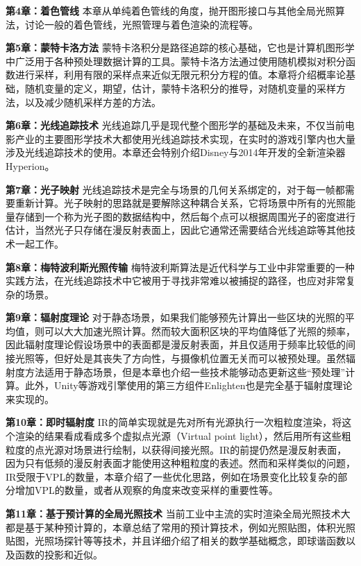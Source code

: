 \textbf{第4章：着色管线 } 本章从单纯着色管线的角度，抛开图形接口与其他全局光照算法，讨论一般的着色管线，光照管理与着色渲染的流程等。

\textbf{第5章：蒙特卡洛方法 } 蒙特卡洛积分是路径追踪的核心基础，它也是计算机图形学中广泛用于各种预处理数据计算的工具。蒙特卡洛方法通过使用随机模拟对积分函数进行采样，利用有限的采样点来近似无限元积分方程的值。本章将介绍概率论基础，随机变量的定义，期望，估计，蒙特卡洛积分的推导，对随机变量的采样方法，以及减少随机采样方差的方法。

\textbf{第6章：光线追踪技术 } 光线追踪几乎是现代整个图形学的基础及未来，不仅当前电影产业的主要图形学技术大都使用光线追踪技术实现，在实时的游戏引擎内也大量涉及光线追踪技术的使用。本章还会特别介绍Disney与2014年开发的全新渲染器Hyperion。

\textbf{第7章：光子映射 } 光线追踪技术是完全与场景的几何关系绑定的，对于每一帧都需要重新计算。光子映射的思路就是要解除这种耦合关系，它将场景中所有的光照能量存储到一个称为光子图的数据结构中，然后每个点可以根据周围光子的密度进行估计，当然光子只存储在漫反射表面上，因此它通常还需要结合光线追踪等其他技术一起工作。

\textbf{第8章：梅特波利斯光照传输 } 梅特波利斯算法是近代科学与工业中非常重要的一种实践方法，在光线追踪技术中它被用于寻找非常难以被捕捉的路径，也应对非常复杂的场景。


\textbf{第9章：辐射度理论 } 对于静态场景，如果我们能够预先计算出一些区块的光照的平均值，则可以大大加速光照计算。然而较大面积区块的平均值降低了光照的频率，因此辐射度理论假设场景中的表面都是漫反射表面，并且仅适用于频率比较低的间接光照等，但好处是其丧失了方向性，与摄像机位置无关而可以被预处理。虽然辐射度方法适用于静态场景，但是本章也介绍一些技术能够动态更新这些“预处理”计算。此外，Unity等游戏引擎使用的第三方组件Enlighten也是完全基于辐射度理论来实现的。


\textbf{第10章：即时辐射度 } IR的简单实现就是先对所有光源执行一次粗粒度渲染，将这个渲染的结果看成看成多个虚拟点光源（Virtual point light），然后用所有这些粗粒度的点光源对场景进行绘制，以获得间接光照。IR的前提仍然是漫反射表面，因为只有低频的漫反射表面才能使用这种粗粒度的表述。然而和采样类似的问题，IR受限于VPL的数量，本章介绍了一些优化思路，例如在场景变化比较复杂的部分增加VPL的数量，或者从观察的角度来改变采样的重要性等。

\textbf{第11章：基于预计算的全局光照技术 } 当前工业中主流的实时渲染全局光照技术大都是基于某种预计算的，本章总结了常用的预计算技术，例如光照贴图，体积光照贴图，光照场探针等等技术，并且详细介绍了相关的数学基础概念，即球谐函数以及函数的投影和近似。


